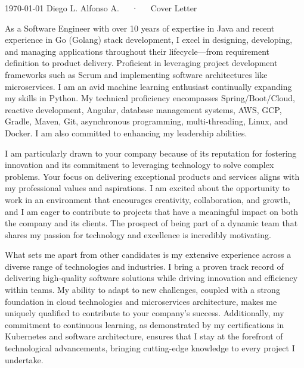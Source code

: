 \documentclass[11pt, a4paper]{awesome-cv}
\begin{document}
\makecvheader[R]

\makecvfooter
  {\today}
  {Diego L. Alfonso A.~~~·~~~Cover Letter}
  {}

\makelettertitle

\begin{cvletter}

As a Software Engineer with over 10 years of expertise in Java and recent experience in Go (Golang) stack development, I excel in designing, developing, and managing applications throughout their lifecycle—from requirement definition to product delivery. Proficient in leveraging project development frameworks such as Scrum and implementing software architectures like microservices. I am an avid machine learning enthusiast continually expanding my skills in Python. My technical proficiency encompasses Spring/Boot/Cloud, reactive development, Angular, database management systems, AWS, GCP, Gradle, Maven, Git, asynchronous programming, multi-threading, Linux, and Docker. I am also committed to enhancing my leadership abilities.

I am particularly drawn to your company because of its reputation for fostering innovation and its commitment to leveraging technology to solve complex problems. Your focus on delivering exceptional products and services aligns with my professional values and aspirations. I am excited about the opportunity to work in an environment that encourages creativity, collaboration, and growth, and I am eager to contribute to projects that have a meaningful impact on both the company and its clients. The prospect of being part of a dynamic team that shares my passion for technology and excellence is incredibly motivating.

What sets me apart from other candidates is my extensive experience across a diverse range of technologies and industries. I bring a proven track record of delivering high-quality software solutions while driving innovation and efficiency within teams. My ability to adapt to new challenges, coupled with a strong foundation in cloud technologies and microservices architecture, makes me uniquely qualified to contribute to your company’s success. Additionally, my commitment to continuous learning, as demonstrated by my certifications in Kubernetes and software architecture, ensures that I stay at the forefront of technological advancements, bringing cutting-edge knowledge to every project I undertake.

\end{cvletter}


\makeletterclosing
\end{document}
